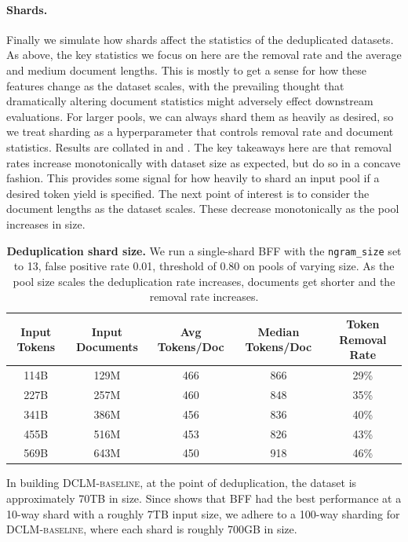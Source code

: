 \documentclass{article}
\newcommand{\hqpool}{\textsc{DCLM-baseline}\xspace}
\begin{document}
\paragraph{Shards.}
Finally we simulate how shards affect the statistics of the deduplicated datasets. As above, the key statistics we focus on here are the removal rate and the average and medium document lengths. This is mostly to get a sense for how these features change as the dataset scales, with the prevailing thought that dramatically altering document statistics might adversely effect downstream evaluations. For larger pools, we can always shard them as heavily as desired, so we treat sharding as a hyperparameter that controls removal rate and document statistics. Results are collated in  and .
The key takeaways here are that removal rates increase monotonically with dataset size as expected, but do so in a concave fashion. This provides some signal for how heavily to shard an input pool if a desired token yield is specified. The next point of interest is to consider the document lengths as the dataset scales. These decrease monotonically as the pool increases in size.

\begin{table}[t]
\centering
\small
\caption{\textbf{Deduplication shard size.} We run a single-shard BFF with the \texttt{ngram\_size} set to 13, false positive rate 0.01, threshold of 0.80 on pools of varying size. As the pool size scales the deduplication rate increases, documents get shorter and the removal rate increases.}
\label{table:dedup-ablations-scale}
\begin{tabular}{cc|ccc}
\toprule
Input Tokens & Input Documents & Avg Tokens/Doc & Median Tokens/Doc & Token Removal Rate  \\
\midrule
114B & 129M & 466 & 866 & 29\% \\
227B & 257M & 460 & 848 & 35\% \\
341B & 386M & 456 & 836 & 40\% \\
455B & 516M & 453 & 826 & 43\% \\
569B & 643M & 450 & 918 & 46\%  \\
\bottomrule
\end{tabular}
\end{table}

In building \hqpool, at the point of deduplication, the dataset is approximately 70TB in size. Since  shows that BFF had the best performance at a 10-way shard with a roughly 7TB input size, we adhere to a 100-way sharding for \hqpool, where each shard is roughly 700GB in size.
\end{document}
